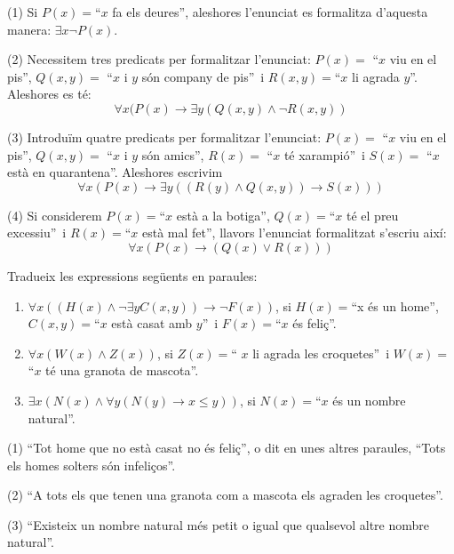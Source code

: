 \begin{solucio}
(1) Si $P(x)=$\enquote{$x$ fa els deures}, aleshores
l'enunciat es formalitza d'aquesta manera: $\exists x\lnot P(x)$.

(2) Necessitem tres predicats per formalitzar l'enunciat: $P(x)=$%
\enquote{$x$ viu en el pis}, $Q(x,y)=$%
\enquote{$x$ i $y$ són company de pis}\ i
$R(x,y)=$\enquote{$x$ li agrada $y$}. Aleshores es
té:%
\[
\forall x(P(x)\longrightarrow\exists y\left(  Q\left(  x,y\right)  \wedge\lnot
R\left(  x,y\right)  \right)
\]


(3) Introduïm quatre predicats per formalitzar l'enunciat: $P(x)=$%
\enquote{$x$ viu en el pis}, $Q(x,y)=$%
\enquote{$x$ i $y$ són amics}, $R(x)=$%
\enquote{$x$ té xarampió}\ i $S(x)=$%
\enquote{$x$ està en quarantena}. Aleshores
escrivim%
\[
\forall x\left(  P(x)\longrightarrow\exists y\left(  \left(  R(y)\wedge
Q\left(  x,y\right)  \right)  \longrightarrow S(x)\right)  \right)
\]


(4) Si considerem $P(x)=$\enquote{$x$ està a la
botiga}, $Q(x)=$\enquote{$x$ té el preu
excessiu}\ i $R(x)=$\enquote{$x$ està mal
fet}, llavors l'enunciat formalitzat s'escriu així:%
\[
\forall x\left(  P(x)\longrightarrow\left(  Q(x)\vee R(x)\right)  \right)
\]

\end{solucio}

\begin{exercici}
Tradueix les expressions següents en paraules:

\begin{enumerate}
\item $\forall x\left(  \left(  H(x)\wedge\lnot\exists yC(x,y)\right)
\longrightarrow\lnot F(x)\right)  $, si $H(x)=$\enquote{x és un
home}, $C(x,y)=$\enquote{$x$ està casat amb $y
$}\ i $F(x)=$\enquote{$x$ és
feliç}.

\item $\forall x\left(  W(x)\wedge Z(x)\right)  $, si $Z(x)=$\enquote{%
$x$ li agrada les croquetes}\ i $W(x)=$\enquote{$x$
té una granota de mascota}.

\item $\exists x\left(  N(x)\wedge\forall y\left(  N(y)\longrightarrow x\leq
y\right)  \right)  $, si $N(x)=$\enquote{$x$ és un nombre
natural}.
\end{enumerate}
\end{exercici}

\begin{solucio}
(1) \enquote{Tot home que no està casat no és
feliç}, o dit en unes altres paraules, \enquote{Tots els homes solters són infeliços}.

(2) \enquote{A tots els que tenen una granota com a mascota els
agraden les croquetes}.

(3) \enquote{Existeix un nombre natural més petit o igual que
qualsevol altre nombre natural}.
\end{solucio}

